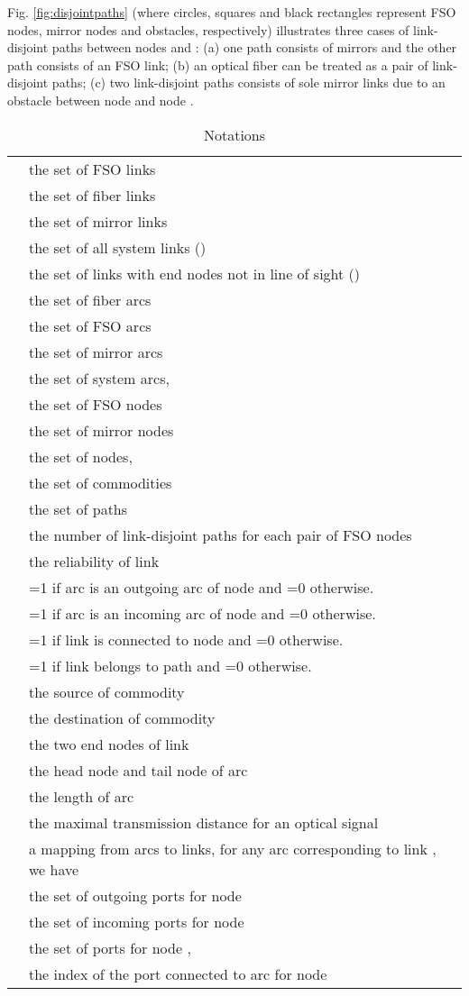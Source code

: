 \documentclass[onecolumn,11pt,draftclsnofoot]{IEEEtran}
\begin{document}
Fig. \ref{fig:disjointpaths} (where circles, squares and black rectangles represent FSO nodes, mirror nodes and obstacles, respectively) illustrates three cases of link-disjoint paths between nodes  and : (a) one path consists of mirrors and the other path consists of an FSO link; (b) an optical fiber can be treated as a pair of link-disjoint paths; (c) two link-disjoint paths consists of sole mirror links due to an obstacle between node  and node .

\begin{table}
\centering
\setlength{\tabcolsep}{1pt}
\caption{Notations}
\label{tab:notations}
\begin{tabular}{lp{16cm}}\cline{1-2}
\hline
 & the set of FSO links\\
 & the set of fiber links\\
 & the set of mirror links\\
 & the set of all system links ()\\
 & the set of links with end nodes not in line of sight ()\\
 & the set of fiber arcs\\
 & the set of FSO arcs\\
 & the set of mirror arcs\\
 & the set of system arcs, \\
 & the set of FSO nodes \\
 & the set of mirror nodes \\
 & the set of nodes, \\
 & the set of commodities\\
 & the set of paths\\
 & the number of link-disjoint paths for each pair of FSO nodes\\
 & the reliability of link \\
 & =1 if arc  is an outgoing arc of node  and =0 otherwise.\\
 & =1 if arc  is an incoming arc of node  and =0 otherwise.\\
 & =1 if link  is connected to node  and =0 otherwise.\\
 & =1 if link  belongs to path  and =0 otherwise.\\
 & the source  of commodity \\
 & the destination of commodity \\
 & the two end nodes of link \\
 & the head node and tail node of arc \\
 & the length of arc \\
 & the maximal transmission distance for an optical signal\\
 & a mapping from arcs to links, for any arc  corresponding to link , we have \\
 &  the set of outgoing ports for node \\
 & the set of incoming ports for node \\
 & the set of ports for node , \\
 & the index of the port connected to arc  for node \\
\hline
\end{tabular}
\hfill
\end{table}
\end{document}
